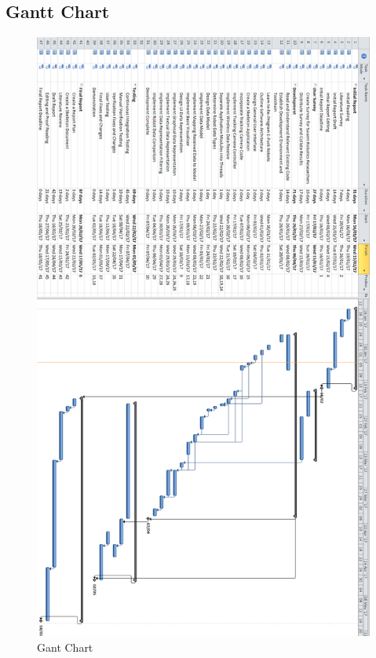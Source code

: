\documentclass[titlepage,hidelinks,10pt]{article}
\begin{document}
\begin{appendix}
\section{Gantt Chart}\label{app:GantChart}
\begin{figure}[H]
	\begin{center}
	\includegraphics[scale=0.45]{Gant90.png}
	\caption{Gant Chart}
	\label{fig:GantChart}
	\end{center}
\end{figure}

\end{appendix}
\newpage
\end{document}
